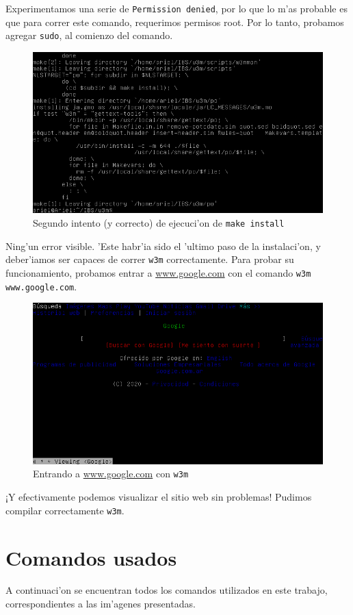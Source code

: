 \documentclass[11pt]{article}
\begin{document}
	Experimentamos una serie de \texttt{Permission denied}, por lo que lo m'as probable es que para correr este comando, requerimos permisos root. Por lo tanto, probamos agregar \texttt{sudo}, al comienzo del comando.
	
	\begin{figure}[H]
		\centering \captionsetup{justification=centering}
		\includegraphics[width=.8\linewidth]{Images/Compile_w3m/make-install_successful}
		\caption{Segundo intento (y correcto) de ejecuci'on de \texttt{make install}}
	\end{figure}
	
	Ning'un error visible. 'Este habr'ia sido el 'ultimo paso de la instalaci'on, y deber'iamos ser capaces de correr \texttt{w3m} correctamente. Para probar su funcionamiento, probamos entrar a \url{www.google.com} con el comando \texttt{w3m www.google.com}.
	
	\begin{figure}[H]
		\centering \captionsetup{justification=centering}
		\includegraphics[width=.8\linewidth]{Images/Compile_w3m/test_w3m}
		\caption{Entrando a \url{www.google.com} con \texttt{w3m}}
	\end{figure}
	
	¡Y efectivamente podemos visualizar el sitio web sin problemas! Pudimos compilar correctamente \texttt{w3m}.
		
	\section{Comandos usados}
		A continuaci'on se encuentran todos los comandos utilizados en este trabajo, correspondientes a las im'agenes presentadas.
		
\end{document}
